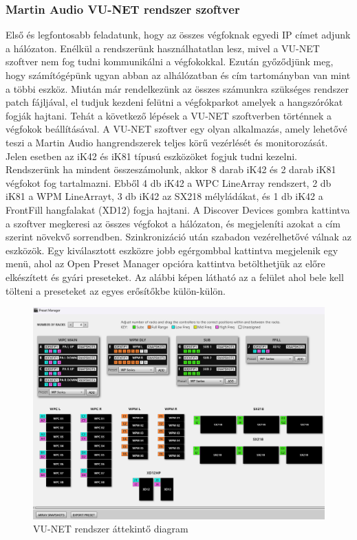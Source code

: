 \subsubsection{Martin Audio VU-NET rendszer szoftver~\cite{VUNETUSERGUIDE}}
Első és legfontosabb feladatunk, hogy az összes végfoknak egyedi IP címet adjunk a hálózaton.
Enélkül a rendszerünk használhatatlan lesz, mivel a VU-NET szoftver nem fog tudni kommunikálni a végfokokkal.
Ezután győződjünk meg, hogy számítógépünk ugyan abban az alhálózatban és cím tartományban van mint a többi eszköz.
Miután már rendelkezünk az összes számunkra szükséges rendszer patch fájljával,
el tudjuk kezdeni felütni a végfokparkot amelyek a hangszórókat fogják hajtani.
Tehát a következő lépések a VU-NET szoftverben történnek a végfokok beállításával.
A VU-NET szoftver egy olyan alkalmazás, amely lehetővé teszi a Martin Audio hangrendszerek teljes körű vezérlését és monitorozását.
Jelen esetben az iK42 és iK81 típusú eszközöket fogjuk tudni kezelni.
Rendszerünk ha mindent összeszámolunk, akkor 8 darab iK42 és 2 darab iK81 végfokot fog tartalmazni.
Ebből 4 db iK42 a WPC LineArray rendszert, 2 db iK81 a WPM LineArrayt, 3 db iK42
az SX218 mélyládákat, és 1 db iK42 a FrontFill hangfalakat (XD12) fogja hajtani.
A Discover Devices gombra kattintva a szoftver megkeresi az összes végfokot a hálózaton, és megjeleníti azokat a
cím szerint növekvő sorrendben. Szinkronizáció után szabadon vezérelhetővé válnak az eszközök.
Egy kiválasztott eszközre jobb egérgombbal kattintva megjelenik egy menü, ahol az Open Preset Manager opcióra kattintva
betölthetjük az előre elkészített és gyári preseteket.
Az alábbi képen látható az a felület ahol bele kell tölteni a preseteket az egyes erősítőkbe külön-külön.
\begin{figure}[H]
	\centering
	\includegraphics[width=\textwidth, keepaspectratio]{figures/vunet_systemdiagram_overall.png}
	\caption{VU-NET rendszer áttekintő diagram}\label{fig:vunet_systemdiagram_overall}
\end{figure}
